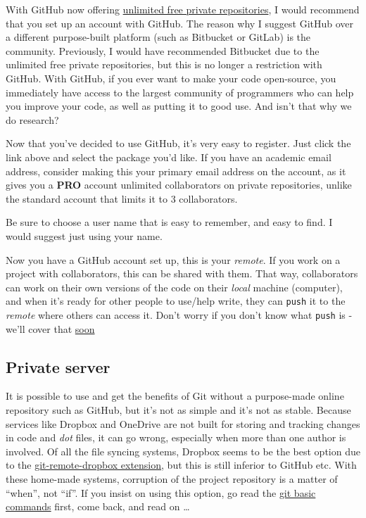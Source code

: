 \documentclass[]{book}
\begin{document}
With GitHub now offering \href{https://Github.com/pricing}{unlimited free private repositories}, I would recommend that you set up an account with GitHub. The reason why I suggest GitHub over a different purpose-built platform (such as Bitbucket or GitLab) is the community. Previously, I would have recommended Bitbucket due to the unlimited free private repositories, but this is no longer a restriction with GitHub. With GitHub, if you ever want to make your code open-source, you immediately have access to the largest community of programmers who can help you improve your code, as well as putting it to good use. And isn't that why we do research?

Now that you've decided to use GitHub, it's very easy to register. Just click the link above and select the package you'd like. If you have an academic email address, consider making this your primary email address on the account, as it gives you a \textbf{PRO} account unlimited collaborators on private repositories, unlike the standard account that limits it to 3 collaborators.

Be sure to choose a user name that is easy to remember, and easy to find. I would suggest just using your name.

Now you have a GitHub account set up, this is your \emph{remote}. If you work on a project with collaborators, this can be shared with them. That way, collaborators can work on their own versions of the code on their \emph{local} machine (computer), and when it's ready for other people to use/help write, they can \texttt{push} it to the \emph{remote} where others can access it. Don't worry if you don't know what \texttt{push} is - we'll cover that \protect\hyperlink{basic-commands}{soon}

\hypertarget{private-server}{%
\subsection{Private server}\label{private-server}}

It is possible to use and get the benefits of Git without a purpose-made online repository such as GitHub, but it's not as simple and it's not as stable. Because services like Dropbox and OneDrive are not built for storing and tracking changes in code and \emph{dot} files, it can go wrong, especially when more than one author is involved. Of all the file syncing systems, Dropbox seems to be the best option due to the \href{https://github.com/anishathalye/git-remote-dropbox}{git-remote-dropbox extension}, but this is still inferior to GitHub etc. With these home-made systems, corruption of the project repository is a matter of ``when'', not ``if''. If you insist on using this option, go read the \protect\hyperlink{basic-commands}{git basic commands} first, come back, and read on \ldots{}
\end{document}

